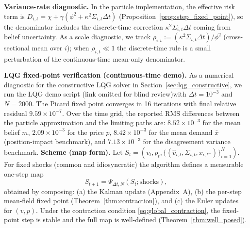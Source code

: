 \begin{table}[t]
  \centering
  \scriptsize
  \setlength{\tabcolsep}{2pt}
  \renewcommand{\arraystretch}{1.15}
  \resizebox{\columnwidth}{!}{}
  \caption{Alignment table: mechanism ``channels'' present in the analytic model versus the particle implementation used in Section~VI.}
  \label{tab:theory_code_alignment}
\end{table}

\textbf{Variance-rate diagnostic.}
In the particle implementation, the effective risk term is $D_{i,t}=\chi+\gamma(\phi^2+\kappa^2\Sigma_{i,t}\Delta t)$ (Proposition~\ref{prop:step_fixed_point}), so the denominator includes the discrete-time correction $\kappa^2\Sigma_{i,t}\Delta t$ coming from belief uncertainty.
As a scale diagnostic, we track $\rho_{i,t}:=(\kappa^2\Sigma_{i,t}\Delta t)/\phi^2$ (cross-sectional mean over $i$); when $\rho_{i,t}\ll 1$ the discrete-time rule is a small perturbation of the continuous-time mean-only denominator.

\textbf{LQG fixed-point verification (continuous-time demo).}
As a numerical diagnostic for the constructive LQG solver in Section~\ref{sec:lqg_constructive}, we run \ifjeicblind the LQG demo script (link omitted for blind review)\else {}\fi with $\Delta t=10^{-3}$ and $N=2000$.
The Picard fixed point converges in 16 iterations with final relative residual $9.59\times 10^{-7}$.
Over the time grid, the reported RMS differences between the particle approximation and the limiting paths are:
$8.52\times 10^{-3}$ for the mean belief $m$, $2.09\times 10^{-3}$ for the price $p$,
$8.42\times 10^{-3}$ for the mean demand $\bar x$ (position-impact benchmark), and $7.13\times 10^{-3}$ for the disagreement variance benchmark.
\textbf{Scheme (map form).} Let $S_t=(v_t,p_t,\{(\hat v_{i,t},\Sigma_{i,t},x_{i,t^-})\}_{i=1}^N)$. For fixed shocks (common and idiosyncratic) the algorithm defines a measurable one-step map
\begin{equation}
S_{t+1}=\Psi_{\Delta t,N}(S_t;\text{shocks}),
\end{equation}
obtained by composing: (a) the Kalman update (Appendix~A), (b) the per-step mean-field fixed point (Theorem~\ref{thm:contraction}), and (c) the Euler updates for $(v,p)$. Under the contraction condition \eqref{eq:global_contraction}, the fixed-point step is stable and the full map is well-defined (Theorem~\ref{thm:well_posed}).

